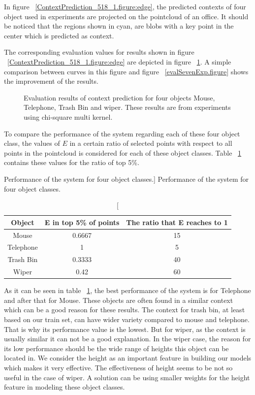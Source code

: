 In figure ~\ref{ContextPrediction_518_1.figure:edge}, the predicted contexts of four object used in experiments 
are projected on the pointcloud of an office.
It should be noticed that the regions shown in cyan, are blobs with a key point in the center which is predicted as 
context.

The corresponding evaluation values for results shown in figure ~\ref{ContextPrediction_518_1.figure:edge} are depicted
in figure ~\ref{Eval_518_1.figure}.
A simple comparison between curves in this figure and figure ~\ref{evalSevenExp.figure} shows the improvement of the 
results.

\begin{figure}
  \begin{center}
  \caption[Evaluation results for four object classes.]
  {Evaluation results of context prediction for four objects Mouse, Telephone, Trash Bin and wiper. These results are from experiments using chi-square multi kernel.}
  \label{Eval_518_1.figure}
  \end{center}
\end{figure}

To compare the performance of the system regarding each of these four object class, the values of $E$ in a certain 
ratio of selected points with respect to all points in the pointcloud is considered for each of these object classes.
Table ~\ref{performance.table} contains these values for the ratio of top 5\%.

\begin{table}
\centering
\caption
[Performance of the system for four object classes.]
{Performance of the system for four object classes.}
\label{performance.table}
\begin{tabular}{|c|c|c|}
\hline
Object & E in top 5\% of points & The ratio that E reaches to 1 \\
\hline
      Mouse & 0.6667 & 15 \\
\hline
      Telephone & 1 & 5 \\
\hline
      Trash Bin & 0.3333 &  40\\
\hline
      Wiper & 0.42 & 60 \\
\hline
\end{tabular}
\end{table}

As it can be seen in table ~\ref{performance.table}, the best performance of the system is for Telephone and after 
that for Mouse.
These objects are often found in a similar context which can be a good reason for these results.
The context for trash bin, at least based on our train set, can have wider variety compared to mouse and telephone.
That is why its performance value is the lowest.
But for wiper, as the context is usually similar it can not be a good explanation.
In the wiper case, the reason for its low performance should be the wide range of heights this object can be located in.
We consider the height as an important feature in building our models which makes it very effective.
The effectiveness of height seems to be not so useful in the case of wiper.
A solution can be using smaller weights for the height feature in modeling these object classes.

